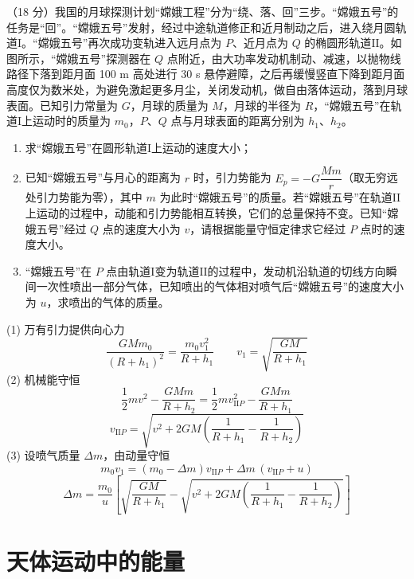 \begin{problem}
（18 分）我国的月球探测计划“嫦娥工程”分为“绕、落、回”三步。“嫦娥五号”的任务是“回”。“嫦娥五号”发射，经过中途轨道修正和近月制动之后，进入绕月圆轨道$\mathrm{I}$。“嫦娥五号”再次成功变轨进入远月点为 $P$、近月点为 $Q$ 的椭圆形轨道$\mathrm{II}$。如图所示，“嫦娥五号”探测器在 $Q$ 点附近，由大功率发动机制动、减速，以抛物线路径下落到距月面 100 m 高处进行 30 s 悬停避障，之后再缓慢竖直下降到距月面高度仅为数米处，为避免激起更多月尘，关闭发动机，做自由落体运动，落到月球表面。已知引力常量为 $G$，月球的质量为 $M$，月球的半径为 $R$，“嫦娥五号”在轨道$\mathrm{I}$上运动时的质量为 $m_0$，$P$、$Q$ 点与月球表面的距离分别为 $h_1$、$h_2$。
\begin{enumerate}[label=(\arabic*),leftmargin=2.5em,itemsep=0pt]
\item 求“嫦娥五号”在圆形轨道$\mathrm{I}$上运动的速度大小；
\item 已知“嫦娥五号”与月心的距离为 $r$ 时，引力势能为 $E_p=-G\dfrac{Mm}{r}$（取无穷远处引力势能为零），其中 $m$ 为此时“嫦娥五号”的质量。若“嫦娥五号”在轨道$\mathrm{II}$上运动的过程中，动能和引力势能相互转换，它们的总量保持不变。已知“嫦娥五号”经过 $Q$ 点的速度大小为 $v$，请根据能量守恒定律求它经过 $P$ 点时的速度大小。
\item “嫦娥五号”在 $P$ 点由轨道$\mathrm{I}$变为轨道$\mathrm{II}$的过程中，发动机沿轨道的切线方向瞬间一次性喷出一部分气体，已知喷出的气体相对喷气后“嫦娥五号”的速度大小为 $u$，求喷出的气体的质量。
\end{enumerate}
\begin{solution}
(1) 万有引力提供向心力
\[
\frac{GMm_0}{(R+h_1)^2}=\frac{m_0v_1^2}{R+h_1}\qquad v_1=\sqrt{\frac{GM}{R+h_1}}
\]
(2) 机械能守恒
\[
\frac{1}{2}mv^2-\frac{GMm}{R+h_2}=\frac{1}{2}mv_{\mathrm{II}P}^2-\frac{GMm}{R+h_1}
\]
\[
v_{\mathrm{II}P}=\sqrt{v^2+2GM\left(\frac{1}{R+h_1}-\frac{1}{R+h_2}\right)}
\]
(3) 设喷气质量 $\Delta m$，由动量守恒
\[
m_0v_1=(m_0-\Delta m)v_{\mathrm{II}P}+\Delta m\,(v_{\mathrm{II}P}+u)
\]
\[
\Delta m=\frac{m_0}{u}\left[\sqrt{\frac{GM}{R+h_1}}-\sqrt{v^2+2GM\left(\frac{1}{R+h_1}-\frac{1}{R+h_2}\right)}\right]
\]
\end{solution}
\end{problem}


\section{天体运动中的能量}
